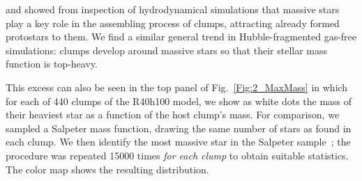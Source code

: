 \cite{Bonnell2004} and \cite{Maschberger2010} showed from inspection of  hydrodynamical simulations that massive stars play a key role in the assembling process of clumps, attracting already formed protostars to them. We find  a similar general trend in Hubble-fragmented gas-free simulations: clumps develop around massive stars so that their stellar mass function is top-heavy. 

This excess can also be seen in the top panel of Fig.~\ref{Fig:2_MaxMass} in which for each of 440 clumps of the R40h100 model, we show as white dots the mass of their heaviest star as a function of the host clump's mass. For comparison, we sampled a Salpeter mass function, drawing the same number of stars as found in each clump. We then identify the most massive star in the Salpeter sample~; the procedure was repeated 15000 times {\it for each clump} to obtain suitable statistics. The color map shows the resulting distribution.




